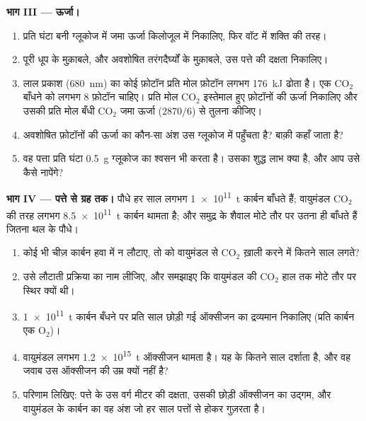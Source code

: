 \begin{problem}[{सप्ताहांत समस्या --- धूप की ऊर्जा का पीछा शर्करा तक:
फ़ोटॉन गिने गए, वाहकों का हिसाब हुआ, ऑक्सीजन तथा कार्बन संतुलित हुए, और
किसी पत्ते की दक्षता निकाली गई}]
\medskip
\noindent\textbf{भाग III --- ऊर्जा।}
\begin{enumerate}[resume]
  \item प्रति घंटा बनी ग्लूकोज में जमा ऊर्जा किलोजूल में निकालिए, फिर
        वॉट में शक्ति की तरह।
  \item पूरी धूप के मुक़ाबले, और अवशोषित तरंगदैर्घ्यों के मुक़ाबले, उस पत्ते
        की दक्षता निकालिए।
  \item लाल प्रकाश (\qty{680}{nm}) का कोई फ़ोटॉन प्रति मोल फ़ोटॉन लगभग
        \qty{176}{kJ} ढोता है। एक $\mathrm{CO_2}$ बाँधने को लगभग 8 फ़ोटॉन
        चाहिए। प्रति मोल $\mathrm{CO_2}$ इस्तेमाल हुए फ़ोटॉनों की ऊर्जा
        निकालिए और उसकी प्रति मोल बँधी $\mathrm{CO_2}$ जमा ऊर्जा
        ($2870/6$) से तुलना कीजिए।
  \item अवशोषित फ़ोटॉनों की ऊर्जा का कौन-सा अंश उस ग्लूकोज में पहुँचता है?
        बाक़ी कहाँ जाता है?
  \item वह पत्ता प्रति घंटा \qty{0.5}{g} ग्लूकोज का श्वसन भी करता है। उसका
        शुद्ध लाभ क्या है, और आप उसे कैसे नापेंगे?
\end{enumerate}

\medskip
\noindent\textbf{भाग IV --- पत्ते से ग्रह तक।}
पौधे हर साल लगभग \qty{1e11}{t} कार्बन बाँधते हैं; वायुमंडल $\mathrm{CO_2}$
की तरह लगभग \qty{8.5e11}{t} कार्बन थामता है; और समुद्र के शैवाल मोटे तौर पर
उतना ही बाँधते हैं जितना थल के पौधे।
\begin{enumerate}[resume]
  \item कोई भी चीज़ कार्बन हवा में न लौटाए, तो  को वायुमंडल
        से $\mathrm{CO_2}$ ख़ाली करने में कितने साल लगते?
  \item उसे लौटाती प्रक्रिया का नाम लीजिए, और समझाइए कि वायुमंडल की
        $\mathrm{CO_2}$ हाल तक मोटे तौर पर स्थिर क्यों थी।
  \item \qty{1e11}{t} कार्बन बँधने पर प्रति साल छोड़ी गई ऑक्सीजन का
        द्रव्यमान निकालिए (प्रति कार्बन एक $\mathrm{O_2}$)।
  \item वायुमंडल लगभग \qty{1.2e15}{t} ऑक्सीजन थामता है। यह
         के कितने साल दर्शाता है, और वह जवाब उस ऑक्सीजन की
        उम्र क्यों नहीं है?
  \item परिणाम लिखिए: पत्ते के उस वर्ग मीटर की दक्षता, उसकी छोड़ी ऑक्सीजन
        का उद्गम, और वायुमंडल के कार्बन का वह अंश जो हर साल पत्तों से होकर
        गुज़रता है।
\end{enumerate}
\end{problem}
